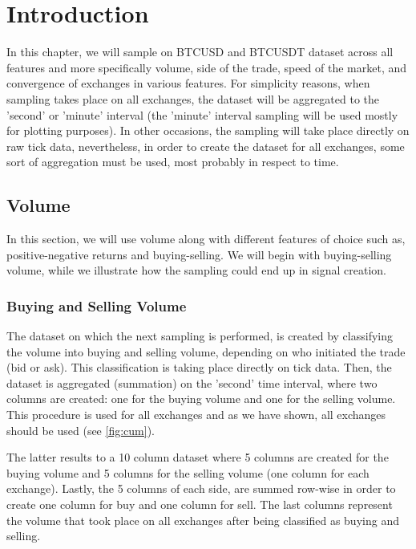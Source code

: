 
\section{Introduction}

In this chapter, we will sample on BTCUSD and BTCUSDT dataset across all features and more specifically volume, side of the trade, speed of the market, and convergence of exchanges in various features. For simplicity reasons, when sampling takes place on all exchanges, the dataset will be aggregated to the 'second' or 'minute' interval (the 'minute' interval sampling will be used mostly for plotting purposes). In other occasions, the sampling will take place directly on raw tick data, nevertheless, in order to create the dataset for all exchanges, some sort of aggregation must be used, most probably in respect to time.

\subsection{Volume}

In this section, we will use volume along with different features of choice such as, positive-negative returns and buying-selling. We will begin with buying-selling volume, while we illustrate how the sampling could end up in signal creation.

\subsubsection{Buying and Selling Volume}

The dataset on which the next sampling is performed, is created by classifying the volume into buying and selling volume, depending on who initiated the trade (bid or ask). This classification is taking place directly on tick data. Then, the dataset is aggregated (summation) on the 'second' time interval, where two columns are created: one for the buying volume and one for the selling volume. This procedure is used for all exchanges and as we have shown, all exchanges should be used (see \ref{fig:cum}). 

The latter results to a 10 column dataset where 5 columns are created for the buying volume and 5 columns for the selling volume (one column for each exchange). Lastly, the 5 columns of each side, are summed row-wise in order to create one column for buy and one column for sell. The last columns represent the volume that took place on all exchanges after being classified as buying and selling.

